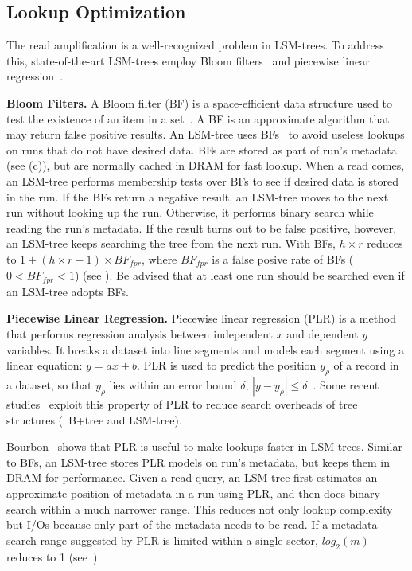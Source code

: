 \subsection{Lookup Optimization}
\label{sec:back:bf}

The read amplification is a well-recognized problem in LSM-trees. To address
this, state-of-the-art LSM-trees employ Bloom filters~\cite{bloomfilter} and
piecewise linear regression~\cite{plr1,plr2,plr3}.

\textbf{Bloom Filters.}
A Bloom filter (BF) is a space-efficient data structure used to test the
existence of an item in a set~\cite{bloomfilter}. A BF is an approximate
algorithm that may return false positive results.  
An LSM-tree uses BFs~\cite{blsm, monkey, rocksdb, pebblesdb, dostoevsky} 
to avoid useless lookups on runs 
that do not have desired data.  BFs are stored as part of
run's metadata (see (c)), but are normally cached in DRAM for
fast lookup.  When a read comes, an LSM-tree performs membership tests
over BFs to see if desired data is stored in the run.  
If the BFs return a negative result, 
an LSM-tree moves to the next run without looking up the run.
Otherwise, it performs binary search while reading the run's metadata.
If the result turns out to be false positive, 
however, an LSM-tree keeps searching the 
tree from the next run. With BFs, $h \times r$ reduces
to $1 + (h \times r-1)\times BF_{fpr}$, where $BF_{fpr}$ is a false posive 
rate of BFs ($0<BF_{fpr}<1$) (see ). Be advised that at least 
one run should be searched even if an LSM-tree adopts BFs.




\textbf{Piecewise Linear Regression.}
Piecewise linear regression (PLR) is a method that performs regression analysis
between independent $x$ and dependent $y$ variables. It breaks a dataset into
line segments and models each segment using a linear equation: $y=ax+b$.
PLR is used to predict the position $y_{\rho}$ of a record in a dataset, so
that $y_{\rho}$ lies within an error bound $\delta$, $|y - y_{\rho}| \leq
\delta$~\cite{plr2, plr1, plr3}.
Some recent studies~\cite{learned-index, alex-plr, bourbon} 
exploit this property 
of PLR to reduce search overheads of tree structures (\eg~{B+tree and LSM-tree}).

Bourbon~\cite{bourbon} shows that PLR is useful to make lookups
faster in LSM-trees.  
Similar to BFs, an LSM-tree stores PLR models on run's metadata, but
keeps them in DRAM for performance.  Given a read query, an LSM-tree first
estimates an approximate position of metadata in a run using PLR, and
then does binary search within a much narrower range.  
This reduces not only
lookup complexity but I/Os because only part of the metadata needs to be read.
If a metadata search range suggested by PLR 
is limited within a single sector, 
$log_{2}(m)$ reduces to 1 (see~).

